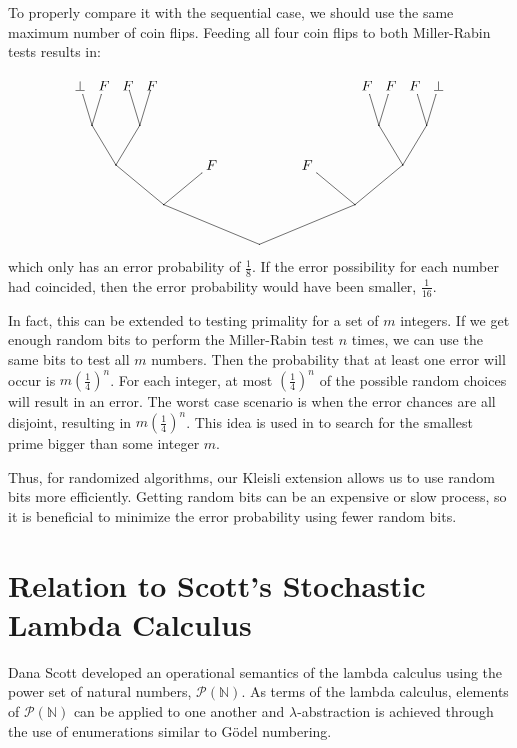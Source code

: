 To properly compare it with the sequential case, we should use the same maximum number of coin flips.  Feeding all four coin flips to both Miller-Rabin tests results in:

\[
\begin{xy}
(45,0)*{} = "v1";%
(21,10)*{} = "v2";%
(69,10)*{} = "v3";%
(9,20)*{} = "v4";%
(33,20)*+{F} = "v5";%
(57,20)*+{F} = "v6";%
(81,20)*{} = "v7";%
(3,30)*{} = "v8";%
(15,30)*{} = "v9";%
(75,30)*{} = "v14";%
(87,30)*{} = "v15";%
(0,40)*+{\bot} = "v16";%
(6,40)*+{F} = "v17";%
(12,40)*{F} = "v18";%
(18,40)*{F} = "v19";%
(72,40)*+{F} = "v28";%
(78,40)*+{F} = "v29";%
(84,40)*+{F} = "v30";%
(90,40)*+{\bot} = "v31";%
{\ar@{-} "v1"; "v2"};%
{\ar@{-} "v1"; "v3"};%
{\ar@{-} "v2"; "v4"};%
{\ar@{-} "v2"; "v5"};%
{\ar@{-} "v3"; "v6"};%
{\ar@{-} "v3"; "v7"};%
{\ar@{-} "v4"; "v8"};%
{\ar@{-} "v4"; "v9"};%
{\ar@{-} "v7"; "v14"};%
{\ar@{-} "v7"; "v15"};%
{\ar@{-} "v8"; "v16"};%
{\ar@{-} "v8"; "v17"};%
{\ar@{-} "v9"; "v18"};%
{\ar@{-} "v9"; "v19"};%
{\ar@{-} "v14"; "v28"};%
{\ar@{-} "v14"; "v29"};%
{\ar@{-} "v15"; "v30"};%
{\ar@{-} "v15"; "v31"};
\end{xy}
\]
which only has an error probability of $\frac{1}{8}$.  If the error possibility for each number had coincided, then the error probability would have been smaller, $\frac{1}{16}$.

In fact, this can be extended to testing primality for a set of $m$ integers.  If we get enough random bits to perform the Miller-Rabin test $n$ times, we can use the same bits to test all $m$ numbers.  Then the probability that at least one error will occur is $m(\frac{1}{4})^n$.  For each integer, at most $(\frac{1}{4})^n$ of the possible random choices will result in an error.  The worst case scenario is when the error chances are all disjoint, resulting in $m(\frac{1}{4})^n$.  This idea is used in \cite{pettie2008randomized} to search for the smallest prime bigger than some integer $m$.

Thus, for randomized algorithms, our Kleisli extension allows us to use random bits more efficiently.  Getting random bits can be an expensive or slow process, so it is beneficial to minimize the error probability using fewer random bits.

\section{Relation to Scott's Stochastic Lambda Calculus}

Dana Scott developed an operational semantics of the lambda calculus using the power set of natural numbers, $\mathcal{P}(\mathbb{N})$.  As terms of the lambda calculus, elements of $\mathcal{P}(\mathbb{N})$ can be applied to one another and $\lambda$-abstraction is achieved through the use of enumerations similar to G\"{o}del numbering.

